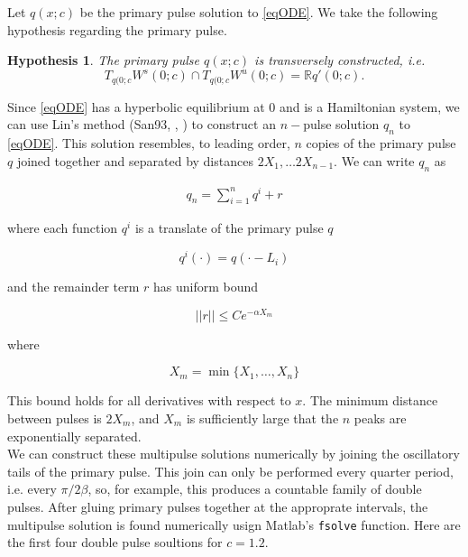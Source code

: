 \documentclass[12pt]{article}
\def\R{{\mathbb R}}
\newtheorem{hypothesis}{Hypothesis}
\begin{document}
Let $q(x; c)$ be the primary pulse solution to \eqref{eqODE}. We take the following hypothesis regarding the primary pulse.

\begin{hypothesis}\label{transverseq}
The primary pulse $q(x; c)$ is transversely constructed, i.e. 
\[
T_{q(0; c} W^s(0; c) \cap T_{q(0; c} W^u(0; c) = \R q'(0; c).
\]
\end{hypothesis}

Since \eqref{eqODE} has a hyperbolic equilibrium at 0 and is a Hamiltonian system, we can use Lin's method (San93, \cite{Sandstede1998}, \cite{Sandstede1997}) to construct an $n-$pulse solution $q_n$ to \eqref{eqODE}. This solution resembles, to leading order, $n$ copies of the primary pulse $q$ joined together and separated by distances $2 X_1, \dots 2 X_{n-1}$. We can write $q_n$ as 

\begin{align}\label{qn}
q_n = \sum_{i = 1}^{n} q^i + r
\end{align}

where each function $q^i$ is a translate of the primary pulse $q$ 

\begin{equation}\label{qi}
q^i(\cdot) = q(\cdot - L_i)
\end{equation}

and the remainder term $r$ has uniform bound

\begin{equation}
||r|| \leq C e^{-\alpha X_m}
\end{equation}

where

\begin{equation}\label{defXm}
X_m = \min\{X_1, \dots, X_n \}
\end{equation}

This bound holds for all derivatives with respect to $x$. The minimum distance between pulses is $2 X_m$, and $X_m$ is sufficiently large that the $n$ peaks are exponentially separated.\\

We can construct these multipulse solutions numerically by joining the oscillatory tails of the primary pulse. This join can only be performed every quarter period, i.e. every $\pi / 2 \beta$, so, for example, this produces a countable family of double pulses. After gluing primary pulses together at the approprate intervals, the multipulse solution is found numerically usign Matlab's \texttt{fsolve} function. Here are the first four double pulse soultions for $c = 1.2$.
\end{document}
